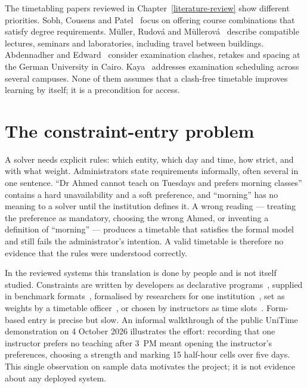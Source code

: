 The timetabling papers reviewed in Chapter~\ref{literature-review} show different priorities. Sobh, Cousens and Patel~\cite{sobh_course_scheduler} focus on offering course combinations that satisfy degree requirements. Müller, Rudová and Müllerová~\cite{muller2025itc} describe compatible lectures, seminars and laboratories, including travel between buildings. Abdennadher and Edward~\cite{abdennadher_guc_exams} consider examination clashes, retakes and spacing at the German University in Cairo. Kaya~\cite{kaya2026drl} addresses examination scheduling across several campuses. None of them assumes that a clash-free timetable improves learning by itself; it is a precondition for access.

\section{The constraint-entry problem}\label{the-constraint-entry-problem}

A solver needs explicit rules: which entity, which day and time, how strict, and with what weight. Administrators state requirements informally, often several in one sentence. ``Dr Ahmed cannot teach on Tuesdays and prefers morning classes'' contains a hard unavailability and a soft preference, and ``morning'' has no meaning to a solver until the institution defines it. A wrong reading --- treating the preference as mandatory, choosing the wrong Ahmed, or inventing a definition of ``morning'' --- produces a timetable that satisfies the formal model and still fails the administrator's intention. A valid timetable is therefore no evidence that the rules were understood correctly.

In the reviewed systems this translation is done by people and is not itself studied. Constraints are written by developers as declarative programs~\cite{abdennadher_guc_exams}, supplied in benchmark formats~\cite{muller2025itc}, formalised by researchers for one institution~\cite{kaya2026drl}, set as weights by a timetable officer~\cite{petrovic2004university}, or chosen by instructors as time slots~\cite{sobh_course_scheduler}. Form-based entry is precise but slow. An informal walkthrough of the public UniTime demonstration on 4 October 2026 illustrates the effort: recording that one instructor prefers no teaching after 3~PM meant opening the instructor's preferences, choosing a strength and marking 15 half-hour cells over five days. This single observation on sample data motivates the project; it is not evidence about any deployed system.

